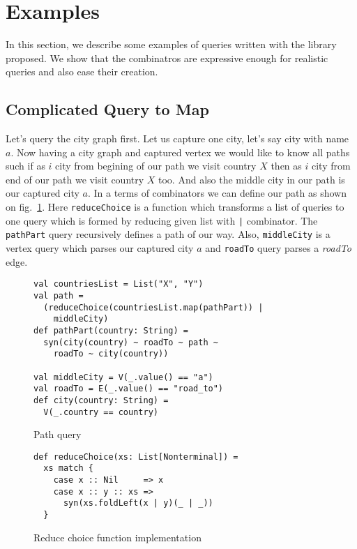 \section{Examples}
\label{sec:examples}

In this section, we describe some examples of queries written with the library proposed.
We show that the combinatros are expressive enough for realistic queries and also ease their creation.


\subsection{Complicated Query to Map}

Let's query the city graph first.
Let us capture one city, let's say city with name $a$.
Now having a city graph and captured vertex we would like to know all paths such if as $i$ city from begining of our path we visit country $X$ then as $i$ city from end of our path we visit country $X$ too.
And also the middle city in our path is our captured city $a$.
In a terms of combinators we can define our path as shown on fig.~\ref{fig:pathQuery}.
Here \lstinline{reduceChoice} is a function which transforms a list of queries to one query which is formed by reducing given list with \lstinline{|} combinator.
The \lstinline{pathPart} query recursively defines a path of our way.
Also, \lstinline{middleCity} is a vertex query which parses our captured city $a$ and \lstinline{roadTo} query parses a \emph{roadTo} edge.

\begin{figure}[h]
\begin{lstlisting}
val countriesList = List("X", "Y")
val path =
  (reduceChoice(countriesList.map(pathPart)) |
    middleCity)
def pathPart(country: String) =
  syn(city(country) ~ roadTo ~ path ~
    roadTo ~ city(country))

val middleCity = V(_.value() == "a")
val roadTo = E(_.value() == "road_to")
def city(country: String) =
  V(_.country == country)
\end{lstlisting}
\caption{Path query}
\label{fig:pathQuery}
\end{figure}

\begin{figure}[h]
\begin{lstlisting}
def reduceChoice(xs: List[Nonterminal]) =
  xs match {
    case x :: Nil     => x
    case x :: y :: xs =>
      syn(xs.foldLeft(x | y)(_ | _))
  }
\end{lstlisting}
\caption{Reduce choice function implementation}
\label{fig:reduceChoice}
\end{figure}

